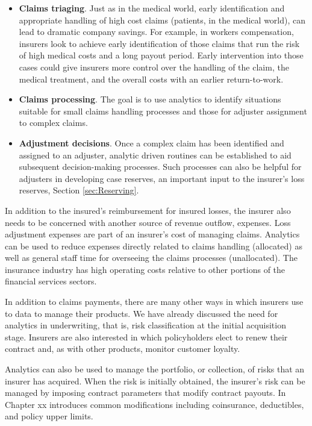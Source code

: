 \documentclass[]{book}
\theoremstyle{definition}
\theoremstyle{definition}
\theoremstyle{definition}
\theoremstyle{remark}
\begin{document}
\begin{itemize}
\item
  \textbf{Claims triaging}. Just as in the medical world, early
  identification and appropriate handling of high cost claims (patients,
  in the medical world), can lead to dramatic company savings. For
  example, in workers compensation, insurers look to achieve early
  identification of those claims that run the risk of high medical costs
  and a long payout period. Early intervention into those cases could
  give insurers more control over the handling of the claim, the medical
  treatment, and the overall costs with an earlier return-to-work.
\item
  \textbf{Claims processing}. The goal is to use analytics to identify
  situations suitable for small claims handling processes and those for
  adjuster assignment to complex claims.
\item
  \textbf{Adjustment decisions}. Once a complex claim has been
  identified and assigned to an adjuster, analytic driven routines can
  be established to aid subsequent decision-making processes. Such
  processes can also be helpful for adjusters in developing case
  reserves, an important input to the insurer's loss reserves, Section
  \ref{sec:Reserving}.
\end{itemize}

In addition to the insured's reimbursement for insured losses, the
insurer also needs to be concerned with another source of revenue
outflow, expenses. Loss adjustment expenses are part of an insurer's
cost of managing claims. Analytics can be used to reduce expenses
directly related to claims handling (allocated) as well as general staff
time for overseeing the claims processes (unallocated). The insurance
industry has high operating costs relative to other portions of the
financial services sectors.

In addition to claims payments, there are many other ways in which
insurers use to data to manage their products. We have already discussed
the need for analytics in underwriting, that is, risk classification at
the initial acquisition stage. Insurers are also interested in which
policyholders elect to renew their contract and, as with other products,
monitor customer loyalty.

Analytics can also be used to manage the portfolio, or collection, of
risks that an insurer has acquired. When the risk is initially obtained,
the insurer's risk can be managed by imposing contract parameters that
modify contract payouts. In Chapter xx introduces common modifications
including coinsurance, deductibles, and policy upper limits.
\end{document}
